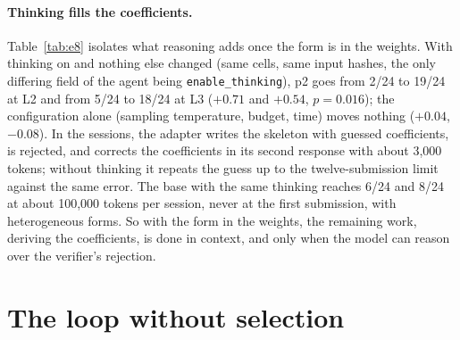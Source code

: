 \documentclass[11pt]{article}
\begin{document}
\begin{table}[!htbp]
\centering\footnotesize

\caption{Template consolidation, two rounds, six held-out instances $\times$ four attempts per step, no thinking. $\uparrow$: rise against the base by the rule. Registered primaries: p1 on E and L5; p2 on every step; p3 on none.}
\label{tab:curated}
\end{table}

\paragraph{Thinking fills the coefficients.} Table~\ref{tab:e8} isolates
what reasoning adds once the form is in the weights. With thinking on and
nothing else changed (same cells, same input hashes, the only differing
field of the agent being \texttt{enable\_thinking}), p2 goes from 2/24 to
19/24 at L2 and from 5/24 to 18/24 at L3 ($+0.71$ and $+0.54$,
$p=0.016$); the configuration alone (sampling temperature, budget, time)
moves nothing ($+0.04$, $-0.08$). In the sessions, the adapter writes the
skeleton with guessed coefficients, is rejected, and corrects the
coefficients in its second response with about 3,000 tokens; without
thinking it repeats the guess up to the twelve-submission limit against
the same error. The base with the same thinking reaches 6/24 and 8/24 at
about 100,000 tokens per session, never at the first submission, with
heterogeneous forms. So with the form in the weights, the remaining work,
deriving the coefficients, is done in context, and only when the model
can reason over the verifier's rejection.

\begin{table}[!htbp]
\centering\footnotesize

\caption{The form and the reasoning, L2 and L3, six held-out instances $\times$ four attempts. The middle rows of each block share every cell and input with the thinking row; only \texttt{enable\_thinking} differs. Registered primary: p2t $-$ p2n; the others are secondary.}
\label{tab:e8}
\end{table}

\section{The loop without selection}
\label{sec:loop}
\end{document}
